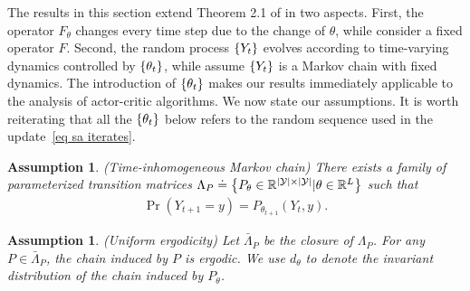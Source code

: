 \documentclass[twoside,11pt]{article}
\newcommand{\fY}{\mathcal{Y}}
\newcommand{\R}{\mathbb{R}}
\newcounter{assucounter}
\numberwithin{assucounter}{section}
\newtheorem{assumption}[assucounter]{Assumption}
\begin{document}
The results in this section extend Theorem 2.1 of \citet{chen2021lyapunov} in two aspects.
First,
the operator $F_\theta$ changes every time step due to the change of $\theta$,
while \citet{chen2021lyapunov} consider a fixed operator $F$.
Second,
the random process $\qty{Y_t}$ evolves according to time-varying dynamics controlled by $\qty{\theta_t}$,
while \citet{chen2021lyapunov} assume $\qty{Y_t}$ is a Markov chain with fixed dynamics.
The introduction of $\qty{\theta_t}$ makes our results immediately applicable to the analysis of actor-critic algorithms.
We now state our assumptions.
It is worth reiterating that all the $\qty{\theta_t}$ below refers to the random sequence used in the update~\eqref{eq sa iterates}.
\begin{assumption}
  \label{assu makovian}
  (Time-inhomogeneous Markov chain)
  There exists a family of parameterized transition matrices $\Lambda_P \doteq \qty{P_{\theta} \in \R^{|\fY| \times |\fY|} | \theta \in \R^L}$ such that
\begin{align}
    \Pr(Y_{t+1} = y) = P_{\theta_{t+1}}(Y_t, y).
\end{align}
\end{assumption}
\begin{assumption}
    \label{assu uniform ergodicity}
    (Uniform ergodicity)
Let $\bar \Lambda_P$ be the closure of $\Lambda_P$.
For any $P \in \bar \Lambda_P$,
the chain induced by $P$ is ergodic.
We use $d_\theta$ to denote the invariant distribution of the chain induced by $P_\theta$.
\end{assumption}
\end{document}
